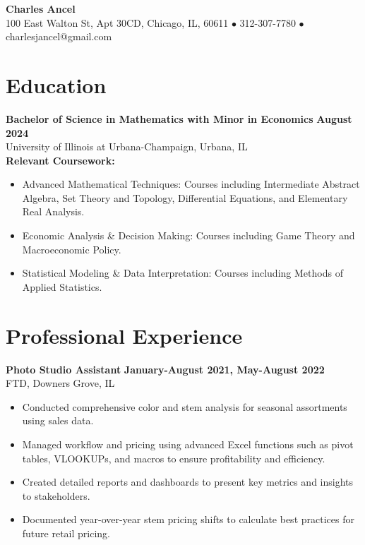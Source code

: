 \documentclass[10pt]{article}
\begin{document}
\begin{center}
    {\Large\textbf{Charles Ancel}}\\
    \vspace{5pt}
    \small{100 East Walton St, Apt 30CD, Chicago, IL, 60611 $\bullet$ 312-307-7780 $\bullet$ charlesjancel@gmail.com}
\end{center}

\vspace{-10pt}

\section*{Education}
\textbf{Bachelor of Science in Mathematics with Minor in Economics} \hfill \textbf{August 2024} \\
University of Illinois at Urbana-Champaign, Urbana, IL \\
\textbf{Relevant Coursework:}
\begin{itemize}
    \item Advanced Mathematical Techniques: Courses including Intermediate Abstract Algebra, Set Theory and Topology, Differential Equations, and Elementary Real Analysis.
    \item Economic Analysis \& Decision Making: Courses including Game Theory and Macroeconomic Policy.
    \item Statistical Modeling \& Data Interpretation: Courses including Methods of Applied Statistics.
\end{itemize}

\vspace{-10pt}
\section*{Professional Experience}
\textbf{Photo Studio Assistant} \hfill \textbf{January-August 2021, May-August 2022} \\
FTD, Downers Grove, IL 
\begin{itemize}
    \item Conducted comprehensive color and stem analysis for seasonal assortments using sales data.
    \item Managed workflow and pricing using advanced Excel functions such as pivot tables, VLOOKUPs, and macros to ensure profitability and efficiency.
    \item Created detailed reports and dashboards to present key metrics and insights to stakeholders.
    \item Documented year-over-year stem pricing shifts to calculate best practices for future retail pricing.
\end{itemize}
\end{document}
